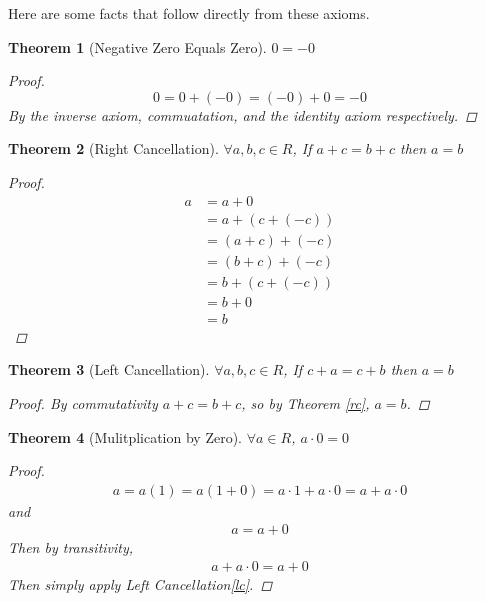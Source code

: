 \documentclass{article}
\newtheorem{thm}{Theorem}
\begin{document}
  Here are some facts that follow directly from these axioms. 
  \begin{thm} [Negative Zero Equals Zero] $0 = -0$
    \begin{proof}
      \begin{equation*}
        0 = 0 + (-0) = (-0) + 0 = -0
      \end{equation*}
      By the inverse axiom, commuatation, and the identity axiom respectively.
    \end{proof}
  \end{thm}
  \begin{thm}[Right Cancellation]\label{rc} $\forall a, b, c \in R$, If $a + c = b + c$ then $a = b$
    \begin{proof}
      \begin{align*}
        a &= a + 0 \\
          &= a + (c + (-c))\\
          &= (a + c) + (-c)\\
          &= (b + c) + (-c)\\
          &= b + (c + (-c))\\
          &= b + 0\\
          &= b
      \end{align*}
    \end{proof}
  \end{thm}
  \begin{thm}[Left Cancellation]\label{lc} $\forall a, b, c \in R$, If $c + a = c + b$ then $a = b$
    \begin{proof}
      By commutativity $a + c = b + c$, so by Theorem \eqref{rc}, $a = b$.
    \end{proof}
  \end{thm}
  \begin{thm}[Mulitplication by Zero]\label{m0} $\forall a \in R$, $a \cdot 0 = 0$
    \begin{proof}
      \begin{align*}
        a = a(1) = a(1 + 0) = a\cdot1 + a\cdot0 = a + a\cdot0
      \end{align*}
      and
      \begin{align*}
        a = a + 0
      \end{align*}
      Then by transitivity,
      \begin{align*}
        a + a\cdot0 = a + 0
      \end{align*}
      Then simply apply Left Cancellation\eqref{lc}.
    \end{proof}
  \end{thm}
\end{document}
